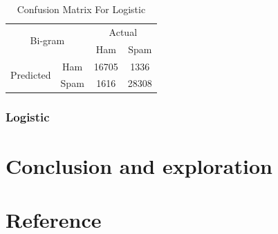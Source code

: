\documentclass[12pt]{article}
\begin{document}
\begin{table}[H]
\begin{floatrow}
{\begin{subtable}{.45\textwidth}
								\begin{tabular}{@{}|c|c|c|c|@{}}
										\toprule
										\multicolumn{2}{|c|}{\multirow{2}{*}{Bi-gram}} & \multicolumn{2}{c|}{Actual} \\ \cmidrule(l){3-4} 
										\multicolumn{2}{|c|}{}                        & Ham          & Spam         \\ \midrule
										\multirow{2}{*}{Predicted}       & Ham        & 16705        & 1336          \\ \cmidrule(l){2-4} 
										& Spam       & 1616          & 28308        \\ \bottomrule
									\end{tabular}
							\end{subtable}
					}{  
						\caption{Confusion Matrix For Logistic}  
						\label{Confusion_Logistic}  
					}  
			\end{floatrow}
	\end{table} 



\subsubsection{Logistic}



\section{Conclusion and exploration}



\section{Reference}
\end{document}
